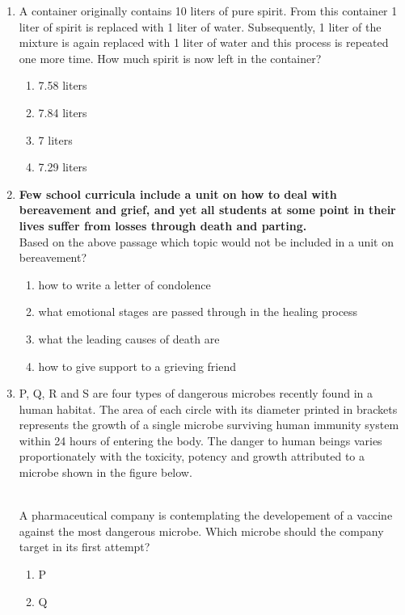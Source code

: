 \documentclass[journal,12pt,onecolumn]{IEEEtran}
\theoremstyle{remark}
\begin{document}
\begin{enumerate} [start=53]
\subsection*{\textbf{Q.61 to Q.65 carry two marks each.}}
\item A container originally contains 10 liters of pure spirit. From this container 1 liter of spirit is replaced with 1 liter of water. Subsequently, 1 liter of the mixture is again replaced with 1 liter of water and this process is repeated one more time. How much spirit is now left in the container?
\begin{enumerate}
    \item 7.58 liters
    \item 7.84 liters
    \item 7 liters
    \item 7.29 liters
\end{enumerate}
\item \textbf{Few school curricula include a unit on how to deal with bereavement and grief, and yet all students at some point in their lives suffer from losses through death and parting.} \\ Based on the above passage which topic would not be included in a unit on bereavement?
\begin{enumerate}
    \item how to write a letter of condolence
    \item what emotional stages are passed through in the healing process
    \item what the leading causes of death are
    \item how to give support to a grieving friend
\end{enumerate}
\item  P, Q, R and S are four types of dangerous microbes recently found in a human habitat. The area of each circle with its diameter printed in brackets represents the growth of a single microbe surviving human immunity system within 24 hours of entering the body. The danger to human beings varies proportionately with the toxicity, potency and growth attributed to a microbe shown in the figure below.
	
\\
A pharmaceutical company is contemplating the developement of a vaccine against the most dangerous microbe. Which microbe should the company target in its first attempt?
\begin{enumerate}
    \item P
    \item Q

\end{enumerate}
\end{enumerate}
\end{document}
